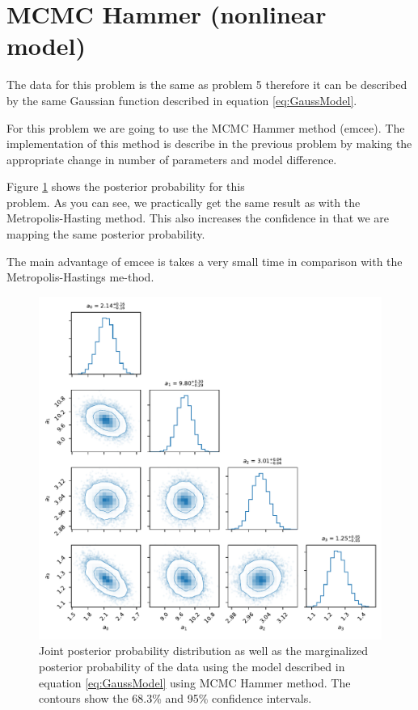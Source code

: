 \section{MCMC Hammer (nonlinear model)}

The data for this problem is the same as problem 5 therefore it can be described by the same Gaussian function described in equation \ref{eq:GaussModel}. 

For this problem we are going to use the MCMC Hammer method (emcee). 
The implementation of this method is describe in the previous problem by making the appropriate change in number of parameters and model difference. 

Figure \ref{fig:gaussEmcee} shows the posterior probability for this \\problem. 
As you can see, we practically get the same result as with the Metropolis-Hasting method. 
This also increases the confidence in that we are mapping the same posterior probability.  

The main advantage of emcee is takes a very small time in comparison with the Metropolis-Hastings me-thod.


\begin{figure}
    \centering
    \includegraphics{CodeAndFigures/gaussianModelEmcee.pdf}
    \caption{Joint posterior probability distribution as well as the marginalized posterior probability of the data using the model described in equation \ref{eq:GaussModel} using MCMC Hammer method. The contours show the 68.3\% and 95\% confidence intervals.}
    \label{fig:gaussEmcee}
\end{figure}